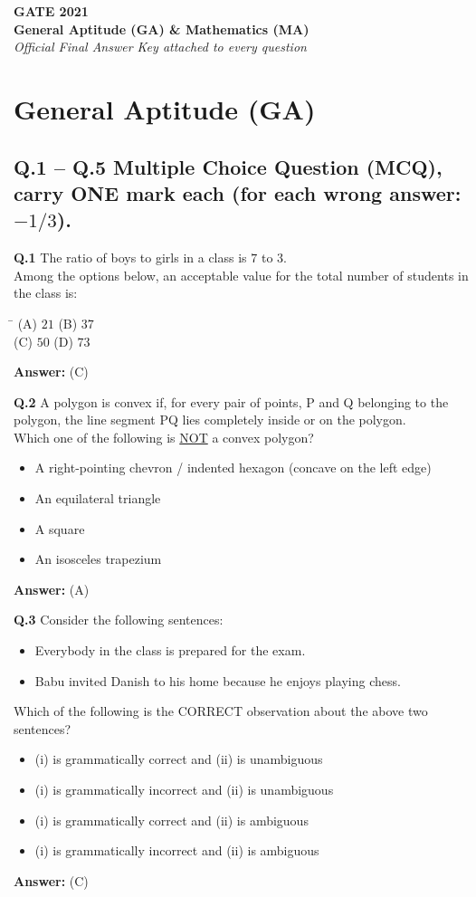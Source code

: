 \documentclass[11pt,a4paper]{article}
\newcommand{\optsfourA}[4]{%
  \begin{tabbing}
    \hspace{0.48\linewidth}\=\kill
    (A) #1 \> (B) #2 \\[2pt]
    (C) #3 \> (D) #4
  \end{tabbing}%
}
\newcommand{\optslistA}[4]{%
  \begin{itemize}
    \setlength{\itemsep}{2pt}\setlength{\parskip}{0pt}
    \item[(A)] #1
    \item[(B)] #2
    \item[(C)] #3
    \item[(D)] #4
  \end{itemize}%
}
\newcommand{\ans}[1]{\textbf{Answer:} #1\par\medskip}
\begin{document}

\begin{center}
  {\LARGE\bfseries GATE 2021}\\[4pt]
  {\large\bfseries General Aptitude (GA) \& Mathematics (MA)}\\[2pt]
  {\small\itshape Official Final Answer Key attached to every question}
\end{center}
\medskip

\section*{General Aptitude (GA)}

\subsection*{Q.1 -- Q.5 Multiple Choice Question (MCQ), carry ONE mark each (for each wrong answer: $-1/3$).}

\textbf{Q.1} The ratio of boys to girls in a class is $7$ to $3$.\\
Among the options below, an acceptable value for the total number of students in the class is:
\optsfourA{$21$}{$37$}{$50$}{$73$}
\ans{(C)}

\textbf{Q.2} A polygon is convex if, for every pair of points, P and Q belonging to the polygon, the line segment PQ lies completely inside or on the polygon.\\
Which one of the following is \underline{NOT} a convex polygon?
\optslistA{A right-pointing chevron / indented hexagon (concave on the left edge)}{An equilateral triangle}{A square}{An isosceles trapezium}
\ans{(A)}

\textbf{Q.3} Consider the following sentences:
\begin{itemize}
  \setlength{\itemsep}{1pt}\setlength{\parskip}{0pt}
  \item[(i)] Everybody in the class is prepared for the exam.
  \item[(ii)] Babu invited Danish to his home because he enjoys playing chess.
\end{itemize}
Which of the following is the CORRECT observation about the above two sentences?
\optslistA{(i) is grammatically correct and (ii) is unambiguous}{(i) is grammatically incorrect and (ii) is unambiguous}{(i) is grammatically correct and (ii) is ambiguous}{(i) is grammatically incorrect and (ii) is ambiguous}
\ans{(C)}
\end{document}
